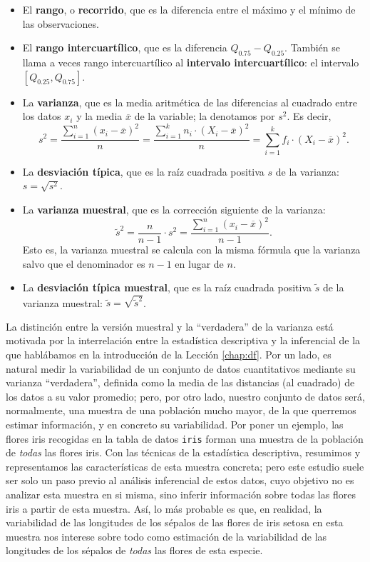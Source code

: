 \documentclass[]{book}
\theoremstyle{definition}
\theoremstyle{definition}
\theoremstyle{definition}
\theoremstyle{remark}
\begin{document}
\begin{itemize}
\item
  El \textbf{rango}, o \textbf{recorrido}, que es la diferencia entre el máximo y el mínimo de las observaciones.
\item
  El \textbf{rango intercuartílico}, que es la diferencia \(Q_{0.75}-Q_{0.25}\). También se llama a veces rango intercuartílico al \textbf{intervalo intercuartílico}: el intervalo \([Q_{0.25},Q_{0.75}]\).
\item
  La \textbf{varianza}, que es la media aritmética de las diferencias al cuadrado entre los datos \(x_i\) y la media \(\overline{x}\) de la variable; la denotamos por \(s^2\). Es decir,
  \[
  s^2=\frac{\sum_{i=1}^n (x_i-\overline{x})^2}{n}=\frac{\sum_{i=1}^k n_i\cdot
  (X_i-\overline{x})^2}{n}=\sum_{i=1}^k f_i\cdot (X_i-\overline{x})^2.
  \]
\item
  La \textbf{desviación típica}, que es la raíz cuadrada positiva \(s\) de la varianza:
  \(s=\sqrt{s^2}\).
\item
  La \textbf{varianza muestral}, que es la corrección siguiente de la varianza:
  \[
  \tilde{s}^2 =\frac{n}{n-1} \cdot s^2=\frac{\sum_{i=1}^n (x_i-\overline{x})^2}{n-1}.
  \]
  Esto es, la varianza muestral se calcula con la misma fórmula que la varianza salvo que el denominador es \(n-1\) en lugar de \(n\).
\item
  La \textbf{desviación típica muestral}, que es la raíz cuadrada positiva \(\tilde{s}\) de la varianza muestral: \(\tilde{s}=\sqrt{\tilde{s}^2}\).
\end{itemize}

La distinción entre la versión muestral y la ``verdadera'' de la varianza está motivada por la interrelación entre la estadística descriptiva y la inferencial de la que hablábamos en la introducción de la Lección \ref{chap:df}. Por un lado, es natural medir la variabilidad de un conjunto de datos cuantitativos mediante su varianza ``verdadera'', definida como la media de las distancias (al cuadrado) de los datos a su valor promedio; pero, por otro lado, nuestro conjunto de datos será, normalmente, una muestra de una población mucho mayor, de la que querremos estimar información, y en concreto su variabilidad. Por poner un ejemplo, las flores iris recogidas en la tabla de datos \texttt{iris} forman una muestra de la población de \emph{todas} las flores iris. Con las técnicas de la estadística descriptiva, resumimos y representamos las características de esta muestra concreta; pero este estudio suele ser solo un paso previo al análisis inferencial de estos datos, cuyo objetivo no es analizar esta muestra en si misma, sino inferir información sobre todas las flores iris a partir de esta muestra. Así, lo más probable es que, en realidad, la variabilidad de las longitudes de los sépalos de las flores de iris setosa en esta muestra nos interese sobre todo como estimación de la variabilidad de las longitudes de los sépalos de \emph{todas} las flores de esta especie.
\end{document}
